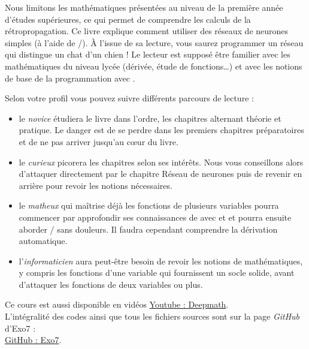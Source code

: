 \medskip

Nous limitons les mathématiques présentées au niveau de la première année d'études supérieures, ce qui permet de comprendre les calculs de la rétropropagation.
Ce livre explique comment utiliser des réseaux de neurones simples (à l'aide de \tensorflow/\keras). À l'issue de sa lecture, vous saurez programmer un réseau qui distingue un chat d'un chien ! 
Le lecteur est supposé être familier avec les mathématiques du niveau lycée  (dérivée, étude de fonctions\ldots) et avec les notions de base de la programmation avec \Python{}.

\medskip

Selon votre profil vous pouvez suivre différents parcours de lecture :
\begin{itemize}
  \item le \emph{novice} étudiera le livre dans l'ordre, les chapitres alternant théorie et pratique. Le danger est de se perdre dans les premiers chapitres préparatoires et de ne pas arriver jusqu'au c\oe ur du livre.

  \item le \emph{curieux} picorera les chapitres selon ses intérêts. Nous vous conseillons alors d'attaquer directement par le chapitre \og{}Réseau de neurones\fg{} puis de revenir en arrière pour revoir les notions nécessaires.
    
  \item le \emph{matheux} qui maîtrise déjà les fonctions de plusieurs variables pourra commencer par approfondir ses connaissances de \Python{} avec \numpy{} et \matplotlib{} et pourra ensuite aborder \tensorflow/\keras{} sans douleurs. Il faudra cependant comprendre la \og{}dérivation automatique\fg{}.
  
  \item l'\emph{informaticien} aura peut-être besoin de revoir les notions de mathématiques, y compris les fonctions d'une variable qui fournissent un socle solide, avant d'attaquer les fonctions de deux variables ou plus.
\end{itemize}


\bigskip




  

\bigskip
\vspace*{\fill}
\begin{center}
Ce cours est aussi disponible en vidéos \href{https://www.www.youtube.com/c/deepmath/}{\og{}Youtube : Deepmath\fg{}}.\\
L'intégralité des codes \Python{} ainsi que tous les fichiers sources sont sur la page \emph{GitHub} d'Exo7 :\\
\href{https://github.com/exo7math/deepmath-exo7}{\og{}GitHub : Exo7\fg{}}.
\end{center}




